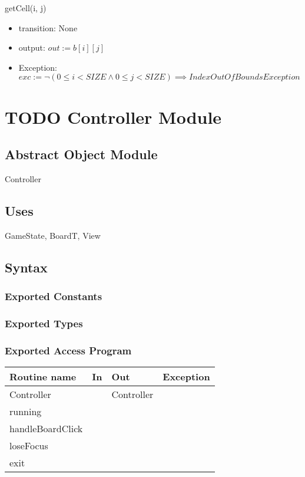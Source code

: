 \documentclass[11pt]{article}
\begin{document}
\begin{itemize}
getCell(i, j)
\begin{itemize}
\item transition: None
\item output: \(out := b[i][j]\)
\item Exception: \(exc := ¬ (0 \leq i < SIZE \land 0 \leq j < SIZE) \implies IndexOutOfBoundsException\)
\end{itemize}

\newpage
\end{itemize}
\section{{\bfseries\sffamily TODO} Controller Module}
\label{sec:org2386cca}
\subsection*{Abstract Object Module}
\label{sec:org16b78a3}
Controller
\subsection*{Uses}
\label{sec:org301cbe7}
GameState, BoardT, View
\subsection*{Syntax}
\label{sec:org4c8caa0}
\subsubsection*{Exported Constants}
\label{sec:org73b62d8}
\subsubsection*{Exported Types}
\label{sec:org2508760}
\subsubsection*{Exported Access Program}
\label{sec:orgddbdea2}
\begin{center}
\begin{tabular}{l|l|l|l}
Routine name & In & Out & Exception\\
\hline
Controller &  & Controller & \\
running &  &  & \\
handleBoardClick &  &  & \\
loseFocus &  &  & \\
exit &  &  & \\
\end{tabular}
\end{center}
\end{document}
